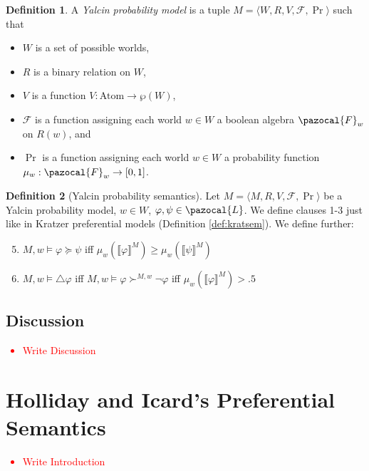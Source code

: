 \documentclass{article}
\theoremstyle{definition}
\newtheorem{definition}{Definition}
\newcommand\todo[1]{\textcolor{red}{#1}}
\renewcommand{\L}{\pazocal{L}}
\newcommand{\F}{\pazocal{F}}
\newcommand{\lb}{\llbracket}
\newcommand{\rb}{\rrbracket}
\begin{document}
\begin{definition}
    A \emph{Yalcin probability model} is a tuple $M = \langle W,R,V,\mathcal{F},\Pr\rangle$ such that
    \begin{itemize}[nosep]
        \renewcommand\labelitemi{--}
      \item $W$ is a set of possible worlds,
      \item $R$ is a binary relation on $W$,
        \item $V$ is a function $V: \text{Atom} \rightarrow \wp(W)$,
        \item $\mathcal{F}$ is a function assigning each world $w \in W$ a boolean algebra $\F_w$ on $R(w)$, and 
          \item $\Pr$ is a function assigning each world $w \in W$ a probability function \\ $\mu_w: \F_w \rightarrow [0,1]$.
    \end{itemize}
\end{definition}

\begin{definition}[Yalcin probability semantics]
    \label{def:yalcsem}
    Let $M = \langle M,R,V,\mathcal{F},\Pr \rangle$ be a Yalcin probability model, $w \in W$, $\varphi, \psi \in \L$. We define clauses 1-3 just like in Kratzer preferential models (Definition \ref{def:kratsem}). We define further:
    \begin{enumerate}[nosep]
  \setcounter{enumi}{4}
      \item $M,w \models \varphi \succeq \psi$ iff $\mu_w(\lb \varphi \rb^M) \geq \mu_w(\lb \psi \rb^M) $
      \item $M,w \models \triangle \varphi$ iff $M,w \models \varphi \succ^{M,w} \neg \varphi$ iff $ \mu_w(\lb \varphi \rb^M) > .5$
    \end{enumerate}
\end{definition}

\subsection{Discussion}
\todo{
  \begin{itemize}
    \item Write Discussion
  \end{itemize}
}
\section{Holliday and Icard's Preferential Semantics}
\todo{
  \begin{itemize}
    \item Write Introduction
  \end{itemize}
}
\end{document}
